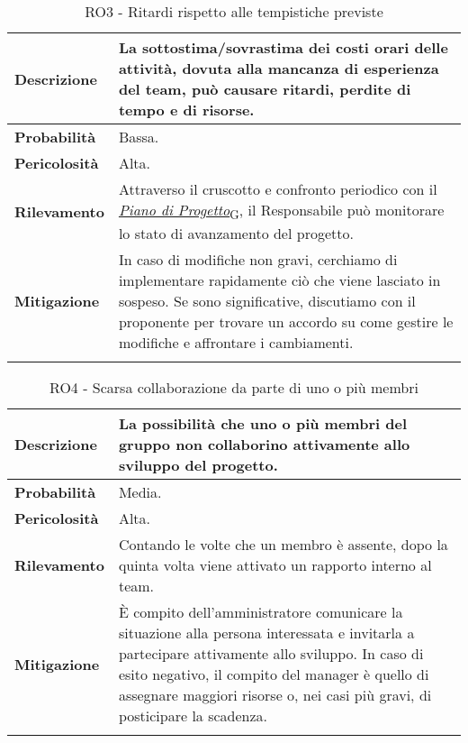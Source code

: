 \begin{longtable}{ | l | p{12cm} | }
    \hline
    \textbf{Descrizione} & La sottostima/sovrastima dei costi orari delle attività, dovuta alla mancanza di esperienza del team, può causare ritardi, perdite di tempo e di risorse. \\
    \hline
    \textbf{Probabilità} & Bassa. \\
    \hline
    \textbf{Pericolosità} & Alta. \\
    \hline
    \textbf{Rilevamento} & Attraverso il cruscotto e confronto periodico con il \href{https://7last.github.io/docs/rtb/documentazione-interna/glossario#piano-di-progetto}{\textit{Piano di Progetto}\textsubscript{G}}, il Responsabile può monitorare lo stato di avanzamento del progetto.\\
    \hline
    \textbf{Mitigazione} & In caso di modifiche non gravi, cerchiamo di implementare rapidamente ciò che viene lasciato in sospeso. Se sono significative, discutiamo con il proponente per trovare un accordo su come gestire le modifiche e affrontare i cambiamenti.\\
    \hline
    \caption{RO3 - Ritardi rispetto alle tempistiche previste}
    \label{table:3}
\end{longtable}

\newpage

\begin{longtable}{ | l | p{12cm} | }
    \hline
    \textbf{Descrizione} & La possibilità che uno o più membri del gruppo non collaborino attivamente allo sviluppo del progetto. \\
    \hline
    \textbf{Probabilità} & Media. \\
    \hline
    \textbf{Pericolosità} & Alta. \\
    \hline
    \textbf{Rilevamento} & Contando le volte che un membro è assente, dopo la quinta volta viene attivato un rapporto interno al team.\\
    \hline
    \textbf{Mitigazione} & È compito dell'amministratore comunicare la situazione alla persona interessata e invitarla a partecipare attivamente allo sviluppo. In caso di esito negativo, il compito del manager è quello di assegnare maggiori risorse o, nei casi più gravi, di posticipare la scadenza.\\
    \hline
    \caption{RO4 - Scarsa collaborazione da parte di uno o più membri}
    \label{table:4}
\end{longtable}


